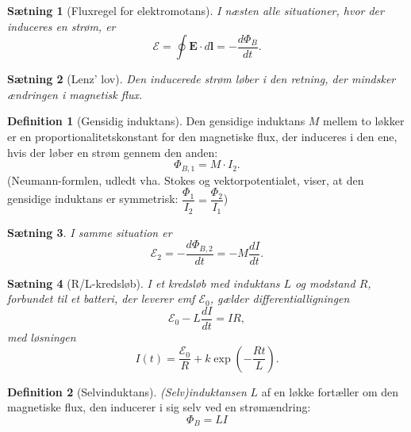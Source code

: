 \documentclass[]{article}
\newtheorem{theorem}{Sætning}
\theoremstyle{definition}
\newtheorem{definition}{Definition}
\begin{document}
\begin{theorem}[Fluxregel for elektromotans]
	I næsten alle situationer, hvor der induceres en strøm, er
\begin{equation*} 
	\mathcal{E} = \oint{\mathbf{E} \cdot d\mathbf{l}} = -\dfrac{d \Phi_B}{dt}.
\end{equation*}
\end{theorem}

\begin{theorem}[Lenz' lov]
	Den inducerede strøm løber i den retning, der mindsker ændringen i magnetisk flux.
\end{theorem}

\begin{definition}[Gensidig induktans]
	Den gensidige induktans $M$ mellem to løkker er en proportionalitetskonstant for den magnetiske flux, der induceres i den ene, hvis der løber en strøm gennem den anden:
	\begin{equation*}
		\Phi_{B,1} = M \cdot I_2.
	\end{equation*}
	(Neumann-formlen, udledt vha. Stokes og vektorpotentialet, viser, at den gensidige induktans er symmetrisk: $ \dfrac{\Phi_1}{I_2} = \dfrac{\Phi_2}{I_1}$)
	\begin{theorem}
		I samme situation er
		\begin{equation*}
			\mathcal{E}_2 = -\frac{d \Phi_{B,2}}{dt} = - M \frac{d I}{dt}.
		\end{equation*}
	\end{theorem}
\end{definition}

\begin{theorem}[R/L-kredsløb]
	I et kredsløb med induktans $L$ og modstand $R$, forbundet til et batteri, der leverer emf $\mathcal{E}_0$, gælder differentialligningen
	\begin{equation*}
		\mathcal{E}_0 - L\frac{d I}{dt} = IR,
	\end{equation*}
	med løsningen
	\begin{equation*}
		I(t) = \dfrac{\mathcal{E}_0}{R} + k \exp(-\frac{Rt}{L}).
	\end{equation*}
\end{theorem}

\begin{definition}[Selvinduktans]
	\emph{(Selv)induktansen} $L$ af en løkke fortæller om den magnetiske flux, den inducerer i sig selv ved en strømændring:
	\begin{equation*}
		\Phi_B = LI
	\end{equation*}
\end{definition}
\end{document}
